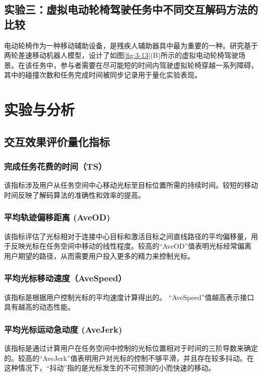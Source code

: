 \subsection{实验三：虚拟电动轮椅驾驶任务中不同交互解码方法的比较}电动轮椅作为一种移动辅助设备，是残疾人辅助器具中最为重要的一种。研究基于两轮差速移动机器人模型，设计了如图\ref{fig:3-13}(B)所示的虚拟电动轮椅驾驶场景。在该任务中，参与者需要在尽可能短的时间内驾驶虚拟轮椅穿越一系列障碍，其中的碰撞次数和任务完成时间被同步记录用于量化实验表现。

\section{实验与分析}

\subsection{交互效果评价量化指标}   
 \subsubsection{完成任务花费的时间（TS）}该指标涉及用户从任务空间中心移动光标至目标位置所需的持续时间。较短的移动时间反映了解码算法的准确性和效率的提高。
 \subsubsection{平均轨迹偏移距离 (AveOD)}该指标评估了光标相对于连接中心目标和激活目标之间直线路径的平均偏移量，用于反映光标在任务空间中移动的线性程度。较高的``AveOD''值表明光标经常偏离用户期望的路径，从而需要用户投入更多的精力来控制光标。
 \subsubsection{平均光标移动速度（AveSpeed）}该指标是根据用户控制光标的平均速度计算得出的。 “AveSpeed”值越高表示接口具有越高的动态性能。
 \subsubsection{平均光标运动急动度 (AveJerk) }该指标是通过计算用户在任务空间中控制的光标位置相对于时间的三阶导数来确定的。较高的``AveJerk''值表明用户对光标的控制不够平滑，并且存在较多抖动。在这种情况下，``抖动''指的是光标发生的不可预测的小而快速的移动。  

